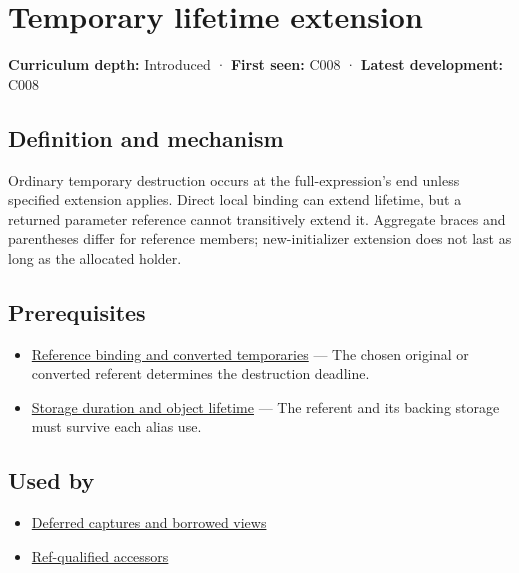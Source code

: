 \hypertarget{appendix-a978b29bbbb0}{}\label{referencestart:appendix-a978b29bbbb0}
\section{Temporary lifetime extension}\label{appendix-a978b29bbbb0-temporary-lifetime-extension}

\textbf{Curriculum depth:} Introduced · \textbf{First seen:} C008 · \textbf{Latest development:} C008

\subsection{Definition and mechanism}\label{appendix-a978b29bbbb0-definition-and-mechanism}

Ordinary temporary destruction occurs at the full-expression's end unless specified extension applies. Direct local binding can extend lifetime, but a returned parameter reference cannot transitively extend it. Aggregate braces and parentheses differ for reference members; new-initializer extension does not last as long as the allocated holder.

\subsection{Prerequisites}\label{appendix-a978b29bbbb0-prerequisites}

\begin{itemize}
\tightlist
\item
  \hyperref[appendix-37856d997bb0]{Reference binding and converted temporaries} --- The chosen original or converted referent determines the destruction deadline.
\item
  \hyperref[appendix-0b104bcba06b]{Storage duration and object lifetime} --- The referent and its backing storage must survive each alias use.
\end{itemize}

\subsection{Used by}\label{appendix-a978b29bbbb0-used-by}

\begin{itemize}
\tightlist
\item
  \hyperref[appendix-aea529eb5175]{Deferred captures and borrowed views}
\item
  \hyperref[appendix-d42039b1d6f7]{Ref-qualified accessors}
\end{itemize}

